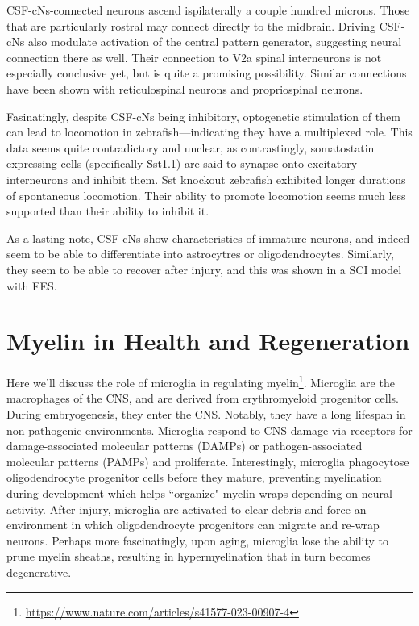 CSF-cNs-connected neurons ascend ispilaterally a couple hundred microns. Those that are particularly rostral may connect directly to the midbrain. Driving CSF-cNs also modulate activation of the central pattern generator, suggesting neural connection there as well. Their connection to V2a spinal interneurons is not especially conclusive yet, but is quite a promising possibility. Similar connections have been shown with reticulospinal neurons and propriospinal neurons.\newline

Fasinatingly, despite CSF-cNs being inhibitory, optogenetic stimulation of them can lead to locomotion in zebrafish---indicating they have a multiplexed role. This data seems quite contradictory and unclear, as contrastingly, somatostatin expressing cells (specifically Sst1.1) are said to synapse onto excitatory interneurons and inhibit them. Sst knockout zebrafish exhibited longer durations of spontaneous locomotion. Their ability to promote locomotion seems much less supported than their ability to inhibit it.\newline

As a lasting note, CSF-cNs show characteristics of immature neurons, and indeed seem to be able to differentiate into astrocytres or oligodendrocytes. Similarly, they seem to be able to recover after injury, and this was shown in a SCI model with EES. 


\section{Myelin in Health and Regeneration}


Here we'll discuss the role of microglia in regulating myelin\footnote{\url{https://www.nature.com/articles/s41577-023-00907-4}}. Microglia are the macrophages of the CNS, and are derived from erythromyeloid progenitor cells. During embryogenesis, they enter the CNS. Notably, they have a long lifespan in non-pathogenic environments. Microglia respond to CNS damage via receptors for damage-associated molecular patterns (DAMPs) or pathogen-associated molecular patterns (PAMPs) and proliferate. Interestingly, microglia phagocytose oligodendrocyte progenitor cells before they mature, preventing myelination during development which helps ``organize" myelin wraps depending on neural activity. After injury, microglia are activated to clear debris and force an environment in which oligodendrocyte progenitors can migrate and re-wrap neurons. Perhaps more fascinatingly, upon aging, microglia lose the ability to prune myelin sheaths, resulting in hypermyelination that in turn becomes degenerative.\newline

